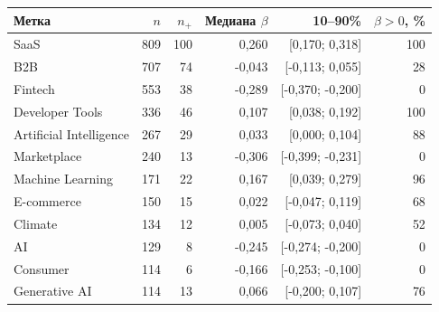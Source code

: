 \begin{tabular}{@{}>{\raggedright\arraybackslash}p{4.6cm}rrrrr@{}}
\toprule
Метка & $n$ & $n_+$ & Медиана $\beta$ & 10--90\% & $\beta>0$, \% \\
\midrule
SaaS & 809 & 100 & 0,260 & [0,170; 0,318] & 100 \\
B2B & 707 & 74 & -0,043 & [-0,113; 0,055] & 28 \\
Fintech & 553 & 38 & -0,289 & [-0,370; -0,200] & 0 \\
Developer Tools & 336 & 46 & 0,107 & [0,038; 0,192] & 100 \\
Artificial Intelligence & 267 & 29 & 0,033 & [0,000; 0,104] & 88 \\
Marketplace & 240 & 13 & -0,306 & [-0,399; -0,231] & 0 \\
Machine Learning & 171 & 22 & 0,167 & [0,039; 0,279] & 96 \\
E-commerce & 150 & 15 & 0,022 & [-0,047; 0,119] & 68 \\
Climate & 134 & 12 & 0,005 & [-0,073; 0,040] & 52 \\
AI & 129 & 8 & -0,245 & [-0,274; -0,200] & 0 \\
Consumer & 114 & 6 & -0,166 & [-0,253; -0,100] & 0 \\
Generative AI & 114 & 13 & 0,066 & [-0,200; 0,107] & 76 \\
\bottomrule
\end{tabular}
